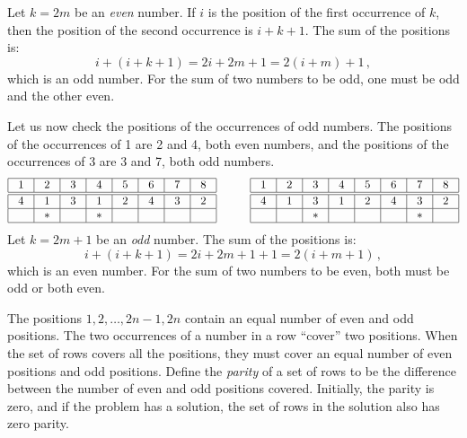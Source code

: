 Let $k=2m$ be an \emph{even} number. If $i$ is the position of the first occurrence of $k$, then the position of the second occurrence is $i+k+1$.
The sum of the positions is:
\[
i+(i+k+1)=2i+2m+1=2(i+m)+1\,,
\]
which is an odd number. For the sum of two numbers to be odd, one must be odd and the other even.

Let us now check the positions of the occurrences of odd numbers. The positions of the occurrences of 1 are 2 and 4, both even numbers, and the positions of the occurrences of 3 are 3 and 7, both odd numbers.
\[
\addtolength{\arraycolsep}{4pt}
\begin{array}{|c|c|c|c|c|c|c|c|}
\hline
1&2&3&4&5&6&7&8\\
\hline\hline
4&1&3&1&2&4&3&2\\\hline
&*&&*&&&&\\\hline
\end{array}
\hspace{3em}
\begin{array}{|c|c|c|c|c|c|c|c|}
\hline
1&2&3&4&5&6&7&8\\
\hline\hline
4&1&3&1&2&4&3&2\\\hline
&&*&&&&*&\\\hline
\end{array}
\]
Let $k=2m+1$ be an \emph{odd} number. The sum of the positions is:
\[
i+(i+k+1)=2i+2m+1+1=2(i+m+1)\,,
\]
which is an even number. For the sum of two numbers to be even, both must be odd or both even.

The positions $1,2,\ldots,2n-1,2n$ contain an equal number of even and odd positions. The two occurrences of a number in a row ``cover'' two positions. When the set of rows covers all the positions, they must cover an equal number of even positions and odd positions. Define the \emph{parity} of a set of rows to be the difference between the number of even and odd positions covered. Initially, the parity is zero, and if the problem has a solution, the set of rows in the solution also has zero parity.

